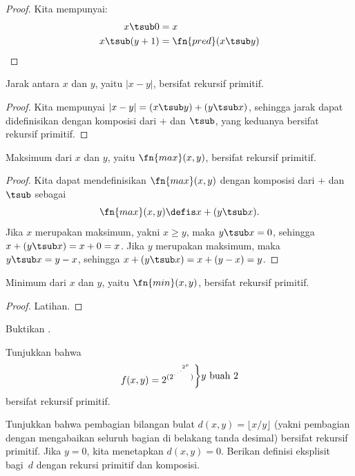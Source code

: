 \documentclass[../../../include/open-logic-section]{subfiles}
\begin{document}
\begin{proof}
  Kita mempunyai:
  \begin{align*}
    x \tsub 0 & = x\\
    x \tsub (y+1) & = \fn{pred}(x \tsub y)
  \end{align*}
\end{proof}

\begin{prop}
 Jarak antara $x$ dan $y$, yaitu $\left|x-y\right|$, bersifat rekursif primitif.
\end{prop}

\begin{proof}
  Kita mempunyai $\left| x-y \right| = (x \tsub y) + (y \tsub x)$, sehingga
  jarak dapat didefinisikan dengan komposisi dari $+$ dan $\tsub$, yang
  keduanya bersifat rekursif primitif.
\end{proof}

\begin{prop}
  Maksimum dari $x$ dan $y$, yaitu $\fn{max}(x,y)$, bersifat rekursif primitif.
\end{prop}

\begin{proof}
  Kita dapat mendefinisikan $\fn{max}(x,y)$ dengan komposisi dari $+$ dan
  $\tsub$ sebagai
  \[
  \fn{max}(x,y) \defis x + (y \tsub x).
  \]
  Jika $x$ merupakan maksimum, yakni $x \ge y$, maka $y \tsub x = 0$, sehingga
  $x + (y \tsub x) = x + 0 = x$. Jika $y$ merupakan maksimum, maka
  $y \tsub x = y - x$, sehingga $x + (y \tsub x) = x + (y - x) = y$.
\end{proof}

\begin{prop}
  Minimum dari $x$ dan $y$, yaitu $\fn{min}(x,y)$, bersifat rekursif primitif.
\end{prop}

\begin{proof}
  Latihan.
\end{proof}

\begin{prob}
  Buktikan .
\end{prob}

\begin{prob}
Tunjukkan bahwa \[
f(x, y) =
2^{(2^{\iddots^{2^{x}}})}\raisebox{1ex}{\bigg\rbrace}
\raisebox{1ex}{\text {$y$ buah $2$}}\] bersifat rekursif primitif.
\end{prob}

\begin{prob}
Tunjukkan bahwa pembagian bilangan bulat $d(x, y) = \lfloor x/y \rfloor$
(yakni pembagian dengan mengabaikan seluruh bagian di belakang tanda desimal)
bersifat rekursif primitif. Jika $y = 0$, kita menetapkan $d(x, y) = 0$.
Berikan definisi eksplisit bagi~$d$ dengan rekursi primitif dan komposisi.
\end{prob}
\end{document}
